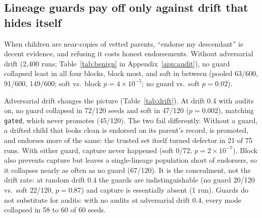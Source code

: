 \documentclass[11pt]{article}
\newcommand{\code}[1]{\texttt{#1}}
\begin{document}
\subsection{Lineage guards pay off only against drift that hides itself}
\label{sec:guards}

When children are near-copies of vetted parents, ``endorse my descendant'' is decent evidence,
and refusing it costs honest endorsements. Without adversarial drift (2{,}400 runs;
Table~\ref{tab:benign} in Appendix~\ref{app:audit}), no guard collapsed least in all four blocks, block most, and soft in between
(pooled 63/600, 91/600, 149/600; soft vs.\ block $p = 4\times10^{-5}$; no guard vs.\ soft
$p = 0.02$).

Adversarial drift changes the picture (Table~\ref{tab:drift}). At drift 0.4 with audits on,
no guard collapsed in 72/120 seeds and soft in 47/120 ($p = 0.002$), matching \code{gated},
which never promotes (45/120). The two fail differently. Without a guard, a drifted child
that looks clean is endorsed on its parent's record, is promoted, and endorses more of the
same: the trusted set itself turned defector in 21 of 75 runs. With either guard, capture
never happened (soft 0/72, $p = 2\times10^{-7}$). Block also prevents capture but leaves a
single-lineage population short of endorsers, so it collapses nearly as often as no guard
(67/120). It is the concealment, not the drift rate: at random drift 0.4 the guards are
indistinguishable (no guard 20/120 vs.\ soft 22/120, $p = 0.87$) and capture is essentially
absent (1 run). Guards do not substitute for audits: with no audits at adversarial drift 0.4,
every mode collapsed in 58 to 60 of 60 seeds.
\end{document}
